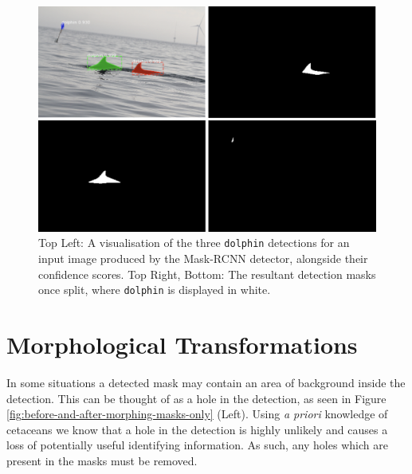 \begin{figure}[h]
	\begin{center}
		\includegraphics[scale=0.5]{Chapter4/figs/190730-001-MOLS0360_-detections.png}
	\end{center}
	\caption{Top Left: A visualisation of the three \texttt{dolphin} detections for an input image produced by the Mask-RCNN detector, alongside their confidence scores. Top Right, Bottom: The resultant detection masks once split, where \texttt{dolphin} is displayed in white.}
	\label{fig:190730-001-MOLS0360_-detections}
\end{figure}


\section{Morphological Transformations}\label{ch:postProcessing,sec:morphologicalTransformations}

In some situations a detected mask may contain an area of background inside the detection. This can be thought of as a hole in the detection, as seen in Figure \ref{fig:before-and-after-morphing-masks-only} (Left). Using \textit{a priori} knowledge of cetaceans we know that a hole in the detection is highly unlikely and causes a loss of potentially useful identifying information. As such, any holes which are present in the masks must be removed. 

